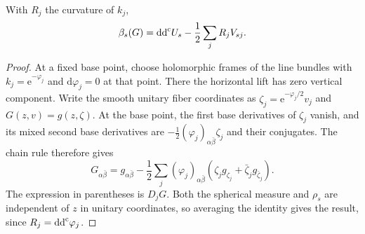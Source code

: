 \begin{lemma}\label{lem:convex-norm-horizontal-average}
With $R_j$ the curvature of $k_j$,
\[
 \beta_s(G)=\mathrm{dd}^{\mathrm{c}} U_s-\frac12\sum_jR_jV_{sj}.
\]
\end{lemma}
\begin{proof}
At a fixed base point, choose holomorphic frames of the line bundles with
$k_j=\mathrm e^{-\varphi_j}$ and $\mathrm d\varphi_j=0$ at that point. There the horizontal lift has zero vertical component. Write the smooth unitary fiber coordinates as
$\zeta_j=\mathrm e^{-\varphi_j/2}v_j$ and $G(z,v)=g(z,\zeta)$.
At the base point, the first base derivatives of $\zeta_j$ vanish, and its mixed second base derivatives are
$-\frac12(\varphi_j)_{\alpha\bar\beta}\zeta_j$ and their conjugates. The chain rule therefore gives
\[
 G_{\alpha\bar\beta}
 =g_{\alpha\bar\beta}-\frac12\sum_j(\varphi_j)_{\alpha\bar\beta}
       (\zeta_jg_{\zeta_j}+\bar\zeta_jg_{\bar\zeta_j}).
\]
The expression in parentheses is $D_jG$. Both the spherical measure and $\rho_s$ are independent of $z$ in unitary coordinates, so averaging the identity gives the result, since $R_j=\mathrm{dd}^{\mathrm{c}}\varphi_j$.
\end{proof}

